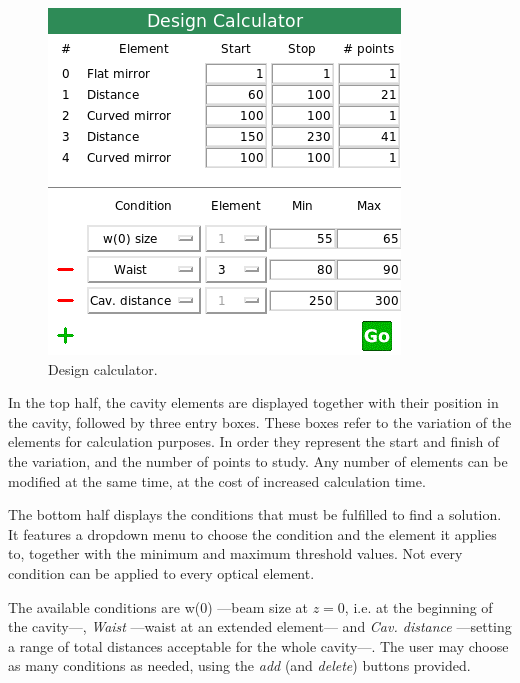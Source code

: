 \documentclass[11pt,a4paper,article,oneside]{memoir}
\begin{document}
			\begin{figure}
				\normalcaptionwidth
				\vspace{-12pt}
				\centering
				\includegraphics[width=\linewidth]{design-box.png}
				\caption[Desing calculator]{Design calculator.}
				\label{fig:design-box}
			\end{figure}
			
			In the top half, the cavity elements are displayed together with their position in the cavity, followed by three entry boxes. These boxes refer to the variation of the elements for calculation purposes. In order they represent the start and finish of the variation, and the number of points to study. Any number of elements can be modified at the same time, at the cost of increased calculation time.
						
			The bottom half displays the conditions that must be fulfilled to find a solution. It features a dropdown menu to choose the condition and the element it applies to, together with the minimum and maximum threshold values. Not every condition can be applied to every optical element.
			
			The available conditions are w(0) ---beam size at $z=0$, i.e. at the beginning of the cavity---, \textit{Waist} ---waist at an extended element--- and \textit{Cav. distance} ---setting a range of total distances acceptable for the whole cavity---. The user may choose as many conditions as needed, using the \textit{add} (and \textit{delete}) buttons provided.
			
\end{document}
